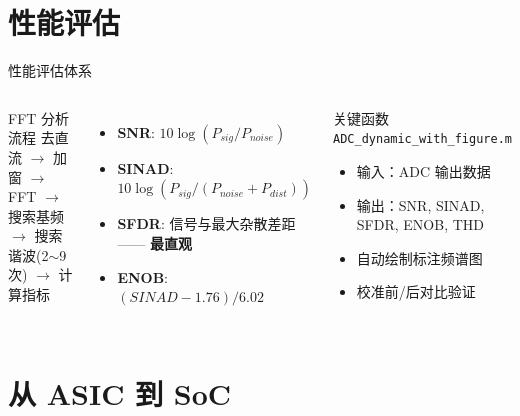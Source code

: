 \documentclass[table,UTF8,11pt,aspectratio=169]{beamer}
\begin{document}
\section{性能评估}

\begin{frame}{性能评估体系}
\begin{columns}[T]
\begin{block}{FFT 分析流程}
去直流 $\to$ 加窗 $\to$ FFT $\to$ 搜索基频\\
$\to$ 搜索谐波(2$\sim$9次) $\to$ 计算指标
\end{block}

\begin{itemize}
    \item \textbf{SNR}: $10\log(P_{sig}/P_{noise})$ 
    \item \textbf{SINAD}: $10\log(P_{sig}/(P_{noise}+P_{dist}))$
    \item \textbf{SFDR}: 信号与最大杂散差距 —— \textbf{最直观}
    \item \textbf{ENOB}: $(SINAD-1.76)/6.02$
\end{itemize}

\begin{block}{关键函数}
\texttt{ADC\_dynamic\_with\_figure.m}
\begin{itemize}
    \item 输入：ADC 输出数据
    \item 输出：SNR, SINAD, SFDR, ENOB, THD
    \item 自动绘制标注频谱图
    \item 校准前/后对比验证
\end{itemize}
\end{block}
\end{columns}
\end{frame}

\section{从 ASIC 到 SoC}
\end{document}
